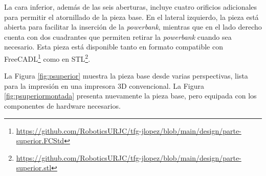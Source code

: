 La cara inferior, además de las seis aberturas, incluye cuatro orificios adicionales para permitir el atornillado de la pieza base. En el lateral izquierdo, la pieza está abierta para facilitar la inserción de la \textit{powerbank}, mientras que en el lado derecho cuenta con dos cuadrantes que permiten retirar la \textit{powerbank} cuando sea necesario. Esta pieza está disponible tanto en formato compatible con FreeCADL\footnote{\url{https://github.com/RoboticsURJC/tfg-jlopez/blob/main/design/parte-superior.FCStd}} como en STL\footnote{\url{https://github.com/RoboticsURJC/tfg-jlopez/blob/main/design/parte-superior.stl}}.

La Figura \ref{fig:psuperior} muestra la pieza base desde varias perspectivas, lista para la impresión en una impresora 3D convencional. La Figura \ref{fig:psuperiormontada} presenta nuevamente la pieza base, pero equipada con los componentes de hardware necesarios.


